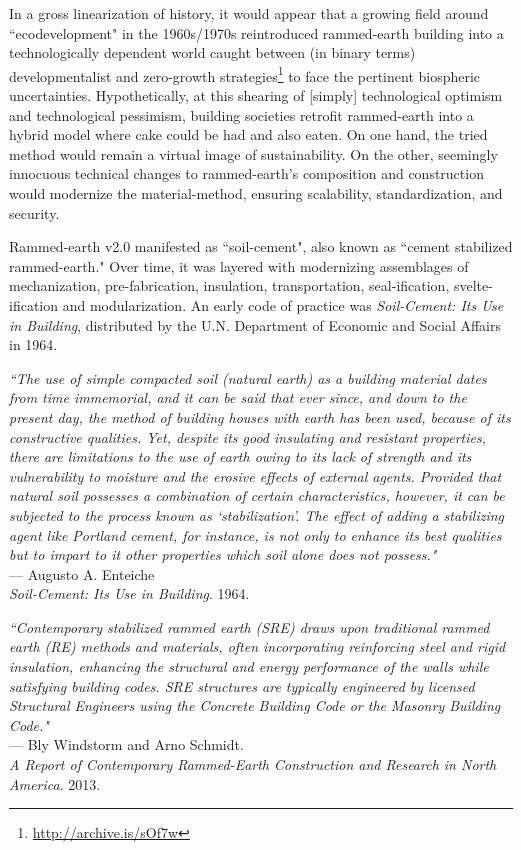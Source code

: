 In a gross linearization of history, it would appear that a growing field around ``ecodevelopment" in the 1960s/1970s reintroduced rammed-earth building into a technologically dependent world caught between (in binary terms) developmentalist and zero-growth strategies\footnote{\url{http://archive.is/sOf7w}} to face the pertinent biospheric uncertainties. Hypothetically, at this shearing of [simply] technological optimism and technological pessimism, building societies retrofit rammed-earth into a hybrid model where cake could be had and also eaten. On one hand, the tried method would remain a virtual image of sustainability. On the other, seemingly innocuous technical changes to rammed-earth's composition and construction would modernize the material-method, ensuring scalability, standardization, and security.

Rammed-earth v2.0 manifested as ``soil-cement", also known as ``cement stabilized rammed-earth." Over time, it was layered with modernizing assemblages of mechanization, pre-fabrication, insulation, transportation, seal-ification, svelte-ification and modularization. An early code of practice was \textit{Soil-Cement: Its Use in Building}, distributed by the U.N. Department of Economic and Social Affairs in 1964.

\begin{flushright}
\small{
\textit{``The use of simple compacted soil (natural earth) as a building material dates from time immemorial, and it can be said that ever since, and down to the present day, the method of building houses with earth has been used, because of its constructive qualities. Yet, despite its good insulating and resistant properties, there are limitations to the use of earth owing to its lack of strength and its vulnerability to moisture and the erosive effects of external agents. Provided that natural soil possesses a combination of certain characteristics, however, it can be subjected to the process known as `stabilization'. The effect of adding a stabilizing agent like Portland cement, for instance, is not only to enhance its best qualities but to impart to it other properties which soil alone does not possess."}}\\ --- Augusto A. Enteiche \\ \textit{Soil-Cement: Its Use in Building}. 1964.
\end{flushright}


\begin{flushright}
\small{
\textit{
``Contemporary stabilized rammed earth (SRE) draws upon traditional rammed earth (RE) methods and materials, often incorporating reinforcing steel and rigid insulation, enhancing the structural and energy performance of the walls while satisfying building codes. SRE structures are typically engineered by licensed Structural Engineers using the Concrete Building Code or the Masonry Building Code."}} \\ --- Bly Windstorm and Arno Schmidt. \\ \textit{A Report of Contemporary Rammed-Earth Construction and Research in North America}. 2013.
\end{flushright}


